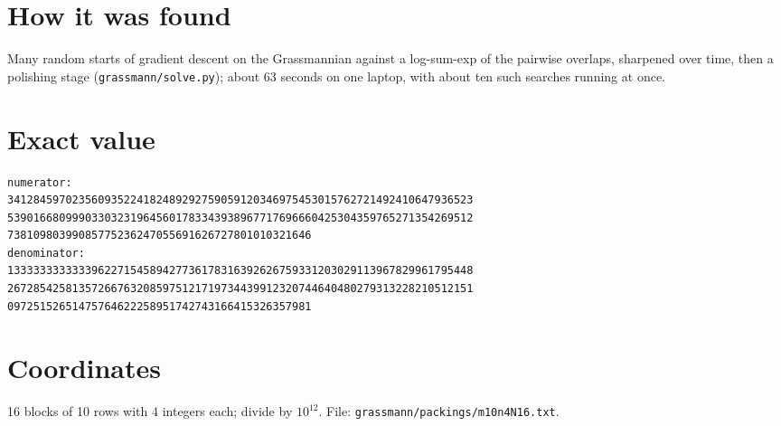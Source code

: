 \documentclass[11pt,a4paper]{article}
\begin{document}
\section{How it was found}
Many random starts of gradient descent on the Grassmannian against a log-sum-exp of the pairwise overlaps, sharpened over time, then a polishing stage (\texttt{grassmann/solve.py}); about 63 seconds on one laptop, with about ten such searches running at once.


\appendix
\section{Exact value}
{\small
\begin{verbatim}
numerator:
341284597023560935224182489292759059120346975453015762721492410647936523
539016680999033032319645601783343938967717696660425304359765271354269512
73810980399085775236247055691626727801010321646
denominator:
133333333333396227154589427736178316392626759331203029113967829961795448
267285425813572667632085975121719734439912320744640480279313228210512151
09725152651475764622258951742743166415326357981
\end{verbatim}}

\section{Coordinates}
16 blocks of 10 rows with 4 integers each; divide by $10^{12}$. File: \texttt{grassmann/packings/m10n4N16.txt}.
{\tiny
\begin{multicols}{3}
\end{multicols}}
\end{document}
